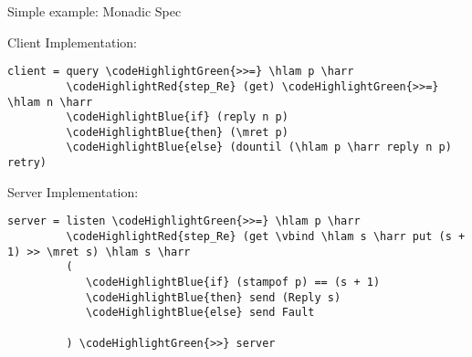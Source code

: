 \documentclass{beamer}
\newcommand\codeHighlightRed[1]{\textcolor[rgb]{1,0,0}{\textbf{#1}}}
\newcommand\codeHighlightBlue[1]{\textcolor[rgb]{0,0,1}{\textbf{#1}}}
\newcommand\codeHighlightGreen[1]{\textcolor[rgb]{0.1,0.7,0.1}{\textbf{#1}}}
\newcommand\codeHighlightOrange[1]{\textcolor[rgb]{0.9, 0.3, 0}{\textbf{#1}}}
\newcommand\vbind[0]{\codeHighlightGreen{>>=}}
\newcommand\mret[0]{\codeHighlightGreen{return}}
\newcommand\hlam[0]{\ensuremath{\backslash}}
\newcommand\harr[0]{\codeHighlightOrange{->}}
\begin{document}
\begin{frame}[fragile]{Simple example: Monadic Spec}

\begin{structure}{Client Implementation:}
\begin{small}
\begin{Verbatim}[commandchars=\\\{\}]
client = query \codeHighlightGreen{>>=} \hlam p \harr
         \codeHighlightRed{step_Re} (get) \codeHighlightGreen{>>=} \hlam n \harr
         \codeHighlightBlue{if} (reply n p)
         \codeHighlightBlue{then} (\mret p)
         \codeHighlightBlue{else} (dountil (\hlam p \harr reply n p) retry)

\end{Verbatim}
\end{small}
\end{structure}

\begin{structure}{Server Implementation:}
\begin{small}
\begin{Verbatim}[commandchars=\\\{\}]
server = listen \codeHighlightGreen{>>=} \hlam p \harr
         \codeHighlightRed{step_Re} (get \vbind \hlam s \harr put (s + 1) >> \mret s) \hlam s \harr
         (
            \codeHighlightBlue{if} (stampof p) == (s + 1)
            \codeHighlightBlue{then} send (Reply s)
            \codeHighlightBlue{else} send Fault

         ) \codeHighlightGreen{>>} server
\end{Verbatim}
\end{small}
\end{structure}

\end{frame}
\end{document}
